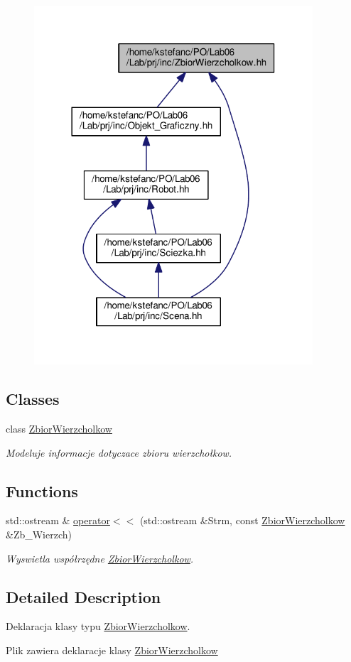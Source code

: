 \begin{figure}[H]
\begin{center}
\leavevmode
\includegraphics[width=294pt]{_zbior_wierzcholkow_8hh__dep__incl}
\end{center}
\end{figure}
\subsection*{Classes}
\begin{DoxyCompactItemize}
\item 
class \hyperlink{class_zbior_wierzcholkow}{Zbior\+Wierzcholkow}
\begin{DoxyCompactList}\small\item\em Modeluje informacje dotyczace zbioru wierzchołkow. \end{DoxyCompactList}\end{DoxyCompactItemize}
\subsection*{Functions}
\begin{DoxyCompactItemize}
\item 
\hypertarget{_zbior_wierzcholkow_8hh_a7738b1f9ac8291715496530031b772e9}{std\+::ostream \& \hyperlink{_zbior_wierzcholkow_8hh_a7738b1f9ac8291715496530031b772e9}{operator$<$$<$} (std\+::ostream \&Strm, const \hyperlink{class_zbior_wierzcholkow}{Zbior\+Wierzcholkow} \&Zb\+\_\+\+Wierzch)}\label{_zbior_wierzcholkow_8hh_a7738b1f9ac8291715496530031b772e9}

\begin{DoxyCompactList}\small\item\em Wyswietla współrzędne \hyperlink{class_zbior_wierzcholkow}{Zbior\+Wierzcholkow}. \end{DoxyCompactList}\end{DoxyCompactItemize}


\subsection{Detailed Description}
Deklaracja klasy typu \hyperlink{class_zbior_wierzcholkow}{Zbior\+Wierzcholkow}. 

Plik zawiera deklaracje klasy \hyperlink{class_zbior_wierzcholkow}{Zbior\+Wierzcholkow} 